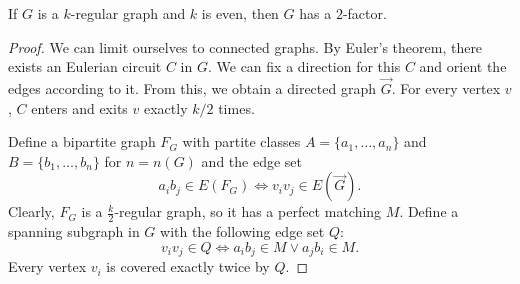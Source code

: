 
\begin{theorem}
  If $G$ is a $k$-regular graph and $k$ is even, then $G$ has a $2$-factor.
\end{theorem}

\begin{proof}
  We can limit ourselves to connected graphs.
  By Euler's theorem, there exists an Eulerian circuit $C$ in $G$.
  We can fix a direction for this $C$ and orient the edges according to it.
  From this, we obtain a directed graph $\vec{G}$.
  For every vertex $v$, $C$ enters and exits $v$ exactly $k/2$ times.

  Define a bipartite graph $F_G$ with partite classes $A = \{a_1, \ldots, a_n\}$
  and $B = \{b_1, \ldots, b_n\}$ for $n = n(G)$ and the edge set
  \[
	a_i b_j \in E(F_G) \iff v_i v_j \in E(\vec{G}).
  \]
  Clearly, $F_G$ is a $\frac{k}{2}$-regular graph, so it has a perfect matching
  $M$.
  Define a spanning subgraph in $G$ with the following edge set $Q$:
  \[
	v_i v_j \in Q \iff a_i b_j \in M \lor a_j b_i \in M.
  \]
  Every vertex $v_i$ is covered exactly twice by $Q$.
\end{proof}


